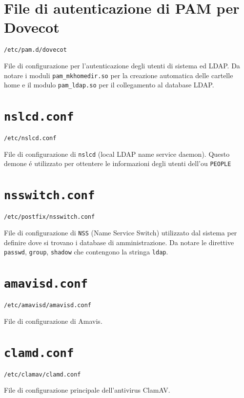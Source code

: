 \documentclass[9pt, a4paper, oneside]{article}
\begin{document}
		\section{File di autenticazione di PAM per Dovecot}
			\par
				\texttt{/etc/pam.d/dovecot}
			\par
				File di configurazione per l'autenticazione 
				degli utenti di sistema ed LDAP. Da notare i 
				moduli \texttt{pam\_mkhomedir.so} per la 
				creazione automatica delle cartelle home e il 
				modulo \texttt{pam\_ldap.so} per il 
				collegamento al database LDAP.
			\texttt{}
			\newpage
		\section{\texttt{nslcd.conf}}
			\par
				\texttt{/etc/nslcd.conf}
			\par
				File di configurazione di \texttt{nslcd} (local 
				LDAP name service daemon). Questo demone \'e 
				utilizzato per ottentere le informazioni degli 
				utenti dell'ou \texttt{PEOPLE}
			\texttt{}
			\newpage
		\section{\texttt{nsswitch.conf}}
			\par
				\texttt{/etc/postfix/nsswitch.conf}
			\par
				File di configurazione di \texttt{NSS} (Name 
				Service Switch) utilizzato dal sistema per 
				definire dove si trovano i database di 
				amministrazione. Da notare le 
				direttive 
				\texttt{passwd}, \texttt{group}, 
				\texttt{shadow} che contengono la stringa 
				\texttt{ldap}.
			\texttt{}
			\newpage

		\section{\texttt{amavisd.conf}}
			\par
				\texttt{/etc/amavisd/amavisd.conf}
			\par
				File di configurazione di Amavis.
			\texttt{}
			\newpage
		\section{\texttt{clamd.conf}}
			\par
				\texttt{/etc/clamav/clamd.conf}
			\par
				File di configurazione principale 
				dell'antivirus ClamAV.
			\texttt{}
			\newpage
\end{document}
